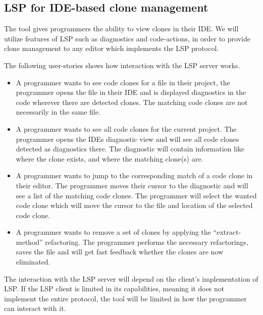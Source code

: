\subsection{LSP for IDE-based clone management}

The tool gives programmers the ability to view clones in their IDE. We will utilize
features of LSP such as diagnostics and code-actions, in order to provide clone management
to any editor which implements the LSP protocol.

The following user-stories shows how interaction with the LSP server works.

\begin{itemize}
	\item A programmer wants to see code clones for a file in their project, the
	      programmer opens the file in their IDE and is displayed diagnostics in the code
	      wherever there are detected clones. The matching code clones are not necessarily
	      in the same file.

	\item A programmer wants to see all code clones for the current project. The
	      programmer opens the IDEs diagnostic view and will see all code clones detected
	      as diagnostics there. The diagnostic will contain information like where the clone
	      exists, and where the matching clone(s) are.

	\item A programmer wants to jump to the corresponding match of a code clone in their
	      editor. The programmer moves their cursor to the diagnostic and will see a list of
	      the matching code clones. The programmer will select the wanted code clone which
	      will move the cursor to the file and location of the selected code clone.

      \item A programmer wants to remove a set of clones by applying the
          ``extract-method'' refactoring. The programmer performs the necessary
          refactorings, saves the file and will get fast feedback whether the
          clones are now eliminated.
\end{itemize}

The interaction with the LSP server will depend on the client's implementation of LSP. If
the LSP client is limited in its capabilities, meaning it does not implement the entire
protocol, the tool will be limited in how the programmer can interact with it.



